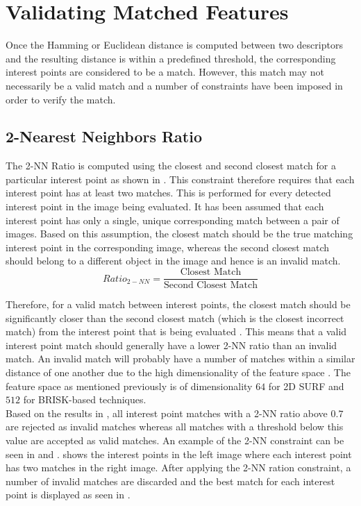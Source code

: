 \section{Validating Matched Features}
\label{sec:validation}
Once the Hamming or Euclidean distance is computed between two descriptors and the resulting distance is within a predefined threshold, the corresponding interest points are considered to be a match. However, this match may not necessarily be a valid match and a number of constraints have been imposed in order to verify the match.\\

\subsection{2-Nearest Neighbors Ratio}
\label{sec:2nnMatching}
The 2-NN Ratio is computed using the closest and second closest match for a particular interest point as shown in  \citep{Lowe2004}. This constraint therefore requires that each interest point has at least two matches. This is performed for every detected interest point in the image being evaluated. It has been assumed that each interest point has only a single, unique corresponding match between a pair of images. Based on this assumption, the closest match should be the true matching interest point in the corresponding image, whereas the second closest match should belong to a different object in the image and hence is an invalid match.\\

\begin{equation}
Ratio_{2-NN} = \frac{\mbox{Closest Match}}{\mbox{Second Closest Match}}
\label{eqn:2nnRatio}
\end{equation}

Therefore, for a valid match between interest points, the closest match should be significantly closer than the second closest match (which is the closest incorrect match) from the interest point that is being evaluated \citep{Lowe2004}. This means that a valid interest point match should generally have a lower 2-NN ratio than an invalid match. An invalid match will probably have a number of matches within a similar distance of one another due to the high dimensionality of the feature space \citep{Lowe2004}. The feature space as mentioned previously is of dimensionality $64$ for 2D SURF and $512$ for BRISK-based techniques.\\

Based on the results in , all interest point matches with a 2-NN ratio above $0.7$ are rejected as invalid matches whereas all matches with a threshold below this value are accepted as valid matches. An example of the 2-NN constraint can be seen in  and .  shows the interest points in the left image where each interest point has two matches in the right image. After applying the 2-NN ration constraint, a number of invalid matches are discarded and the best match for each interest point is displayed  as seen in .\\


